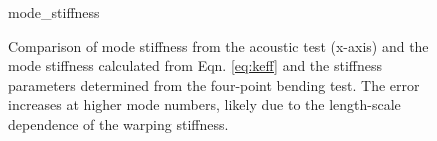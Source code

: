 \documentclass[../thesis.tex]{subfiles}
\begin{document}
\begin{figure}
  {mode_stiffness}
  \caption{Comparison of mode stiffness from the acoustic test (x-axis) and the mode stiffness calculated from Eqn. \eqref{eq:keff} and the stiffness parameters determined from the four-point bending test. The error increases at higher mode numbers, likely due to the length-scale dependence of the warping stiffness.}
  \label{fig:keff}
\end{figure}
\end{document}
